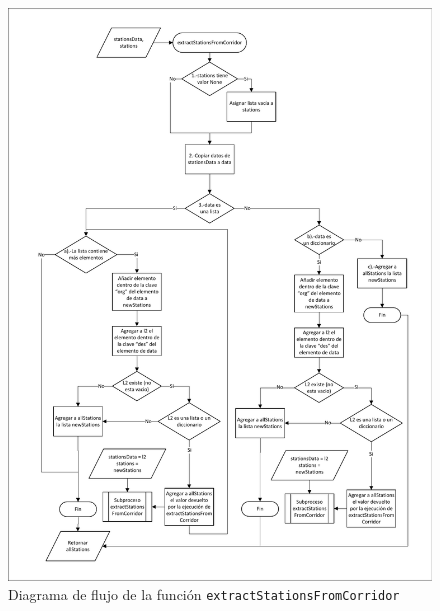 \begin{figure}[hbpt]
\centering
\includegraphics[width=1\textwidth]{fig/Diagramas de flujo/extractStationsFromCorridor.pdf}
\caption{Diagrama de flujo de la función \texttt{extractStationsFromCorridor} }
\label{fig:diagramaFlujoExtractStationsFromCorridor}
\end{figure}

